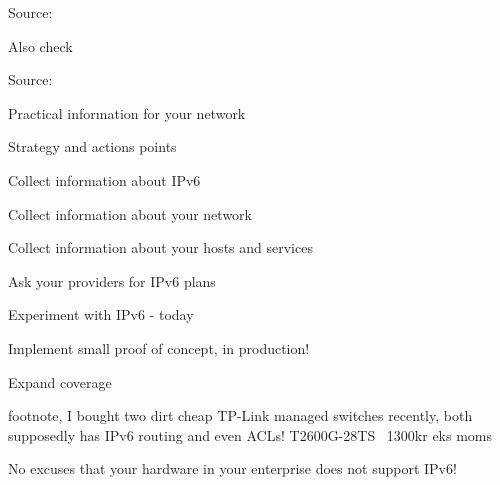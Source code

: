 \documentclass[20pt,landscape,a4paper,footrule]{foils}
\begin{document}

Source: 

Also check 

\centerline{}





Source:


Practical information for your network

\begin{list1}
\item Strategy and actions points
\begin{list2}
\item Collect information about IPv6
\item Collect information about your network
\item Collect information about your hosts and services
\item Ask your providers for IPv6 plans
\item Experiment with IPv6 - today
\item Implement small proof of concept, in production!
\item Expand coverage
\end{list2}
\end{list1}

footnote, I bought two dirt cheap TP-Link managed switches recently, both supposedly has IPv6 routing and even ACLs! T2600G-28TS ~1300kr eks moms\\ {\footnotesize{}}

No excuses that your hardware in your enterprise does not support IPv6!


\end{document}
